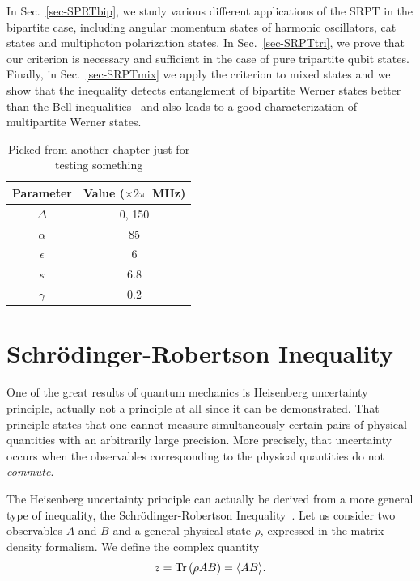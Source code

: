 In Sec.~\ref{sec-SPRTbip}, we study various different applications of the SRPT in the bipartite case, including angular momentum states of harmonic oscillators, cat states and multiphoton polarization states. In Sec.~\ref{sec-SRPTtri}, we prove that our criterion is necessary and sufficient in the case of pure tripartite qubit states. Finally, in Sec.~\ref{sec-SRPTmix} we apply the criterion to mixed states and we show that the inequality detects entanglement of bipartite Werner states better than the Bell inequalities~\cite{Bel64} and also leads to a good characterization of multipartite Werner states.

\begin{table} \begin{center}
  \caption{Picked from another chapter just for testing something}
  \begin{tabular}{c|c}
      Parameter    & Value ($\times 2 \pi$~MHz) \\ \hline \hline
      $\Delta$     & 0, 150                     \\
      ${\alpha}$   & 85                         \\
      ${\epsilon}$ & 6                          \\
      ${\kappa}$   & 6.8                        \\
      ${\gamma}$   & 0.2
  \end{tabular}
\end{center}\end{table}

\section{Schr\"odinger-Robertson Inequality} \label{sec-SRI}

One of the great results of quantum mechanics is Heisenberg uncertainty principle, actually not a principle at all since it can be demonstrated. That principle states that one cannot measure simultaneously certain pairs of physical quantities with an arbitrarily large precision. More precisely, that uncertainty occurs when the observables corresponding to the physical quantities do not \emph{commute}.

The Heisenberg uncertainty principle can actually be derived from a more general type of inequality, the Schr\"odinger-Robertson Inequality~\cite{Sch30}. Let us consider two observables $A$ and $B$ and a general physical state $\rho$, expressed in the matrix density formalism. We define the complex quantity
\[ z=\mbox{\textup{Tr}}\left( \rho A B \right)= \langle AB \rangle.\]

